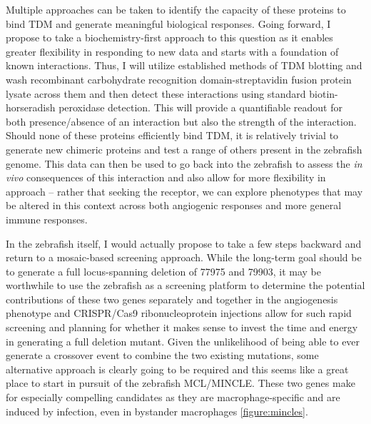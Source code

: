 Multiple approaches can be taken to identify the capacity of these proteins to bind TDM and generate meaningful biological responses. Going forward, I propose to take a biochemistry-first approach to this question as it enables greater flexibility in responding to new data and starts with a foundation of known interactions. Thus, I will utilize established methods of TDM blotting \citep{Jegouzo2014} and wash recombinant carbohydrate recognition domain-streptavidin fusion protein lysate across them and then detect these interactions using standard biotin-horseradish peroxidase detection. This will provide a quantifiable readout for both presence/absence of an interaction but also the strength of the interaction. Should none of these proteins efficiently bind TDM, it is relatively trivial to generate new chimeric proteins and test a range of others present in the zebrafish genome. This data can then be used to go back into the zebrafish to assess the \textit{in vivo} consequences of this interaction and also allow for more flexibility in approach -- rather that seeking the receptor, we can explore phenotypes that may be altered in this context across both angiogenic responses and more general immune responses.

In the zebrafish itself, I would actually propose to take a few steps backward and return to a mosaic-based screening approach. While the long-term goal should be to generate a full locus-spanning deletion of 77975 and 79903, it may be worthwhile to use the zebrafish as a screening platform to determine the potential contributions of these two genes separately and together in the angiogenesis phenotype and CRISPR/Cas9 ribonucleoprotein injections allow for such rapid screening and planning for whether it makes sense to invest the time and energy in generating a full deletion mutant. Given the unlikelihood of being able to ever generate a crossover event to combine the two existing mutations, some alternative approach is clearly going to be required and this seems like a great place to start in pursuit of the zebrafish MCL/MINCLE. These two genes make for especially compelling candidates as they are macrophage-specific and are induced by infection, even in bystander macrophages \autoref{figure:mincles}. 


